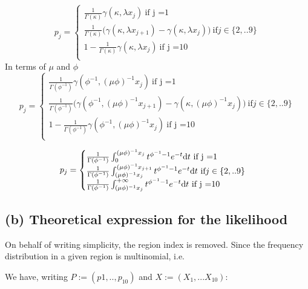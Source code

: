 \documentclass[a4paper, 12pt]{article}
\begin{document}
    \[
    p_j =
    \begin{cases}
     \frac{1}{\Gamma(\kappa)} \gamma(\kappa, \lambda x_j)  \ \text{if j =1}\\
      \frac{1}{\Gamma(\kappa)} \Big(\gamma(\kappa, \lambda x_{j+1}) - \gamma(\kappa, \lambda x_j)  \Big)   \ \text{if} j \in \{2,..9\}\\
     1- \frac{1}{\Gamma(\kappa)} \gamma(\kappa, \lambda x_j)  \ \text{if j =10}\\
    \end{cases}
    \] In terms of \(\mu\) and \(\phi\) \[
    p_j =
    \begin{cases}
     \frac{1}{\Gamma(\phi^{-1})} \gamma(\phi^{-1}, (\mu \phi)^{-1} x_j)  \ \text{if j =1}\\
      \frac{1}{\Gamma(\phi^{-1})} \Big(\gamma(\phi^{-1}, (\mu \phi)^{-1}x_{j+1}) - \gamma(\kappa, (\mu \phi)^{-1} x_j)  \Big)   \ \text{if} j \in \{2,..9\}\\
     1- \frac{1}{\Gamma(\phi^{-1})} \gamma(\phi^{-1}, (\mu \phi)^{-1} x_j)  \ \text{if j =10}\\
    \end{cases}
    \]

    \[
    p_j =
    \begin{cases}
     \frac{1}{\Gamma(\phi^{-1})} \int^{(\mu \phi)^{-1} x_j}_0 t^{\phi^{-1}-1} e^{-t} \mathrm{d}{t}   \ \text{if j =1}\\
      \frac{1}{\Gamma(\phi^{-1})} \int^{(\mu \phi)^{-1}x_{j+1}}_{ (\mu \phi)^{-1} x_j} t^{\phi^{-1}-1} e^{-t} \mathrm{d}{t}  \ \text{if} j \in \{2,..9\}\\
     \frac{1}{\Gamma(\phi^{-1})} \int^{+ \infty}_{(\mu \phi)^{-1}x_j} t^{\phi^{-1}-1} e^{-t} \mathrm{d}{t}  \ \text{if j =10}\\
    \end{cases}
    \]

    \hypertarget{b-theoretical-expression-for-the-likelihood}{%
    \subsection{(b) Theoretical expression for the
    likelihood}\label{b-theoretical-expression-for-the-likelihood}}

    On behalf of writing simplicity, the region index is removed. Since
    the frequency distribution in a given region is multinomial, i.e.~

    We have, writing \(P:=(p{1},..,p_{10})\) and
    \(X:= (X_{1},... X_{10})\):
\end{document}
